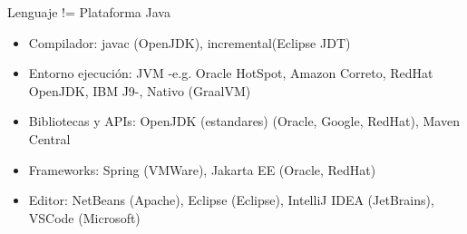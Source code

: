 \documentclass[aspectratio=169]{beamer}
\begin{document}
\begin{frame}{Lenguaje != Plataforma}
    Java
	\begin{itemize}
	\item Compilador: javac (OpenJDK), incremental(Eclipse JDT)
    \item Entorno ejecución: JVM -e.g. Oracle HotSpot, Amazon Correto, RedHat OpenJDK, IBM J9-, Nativo (GraalVM)
    \item Bibliotecas y APIs: OpenJDK (estandares) (Oracle, Google, RedHat), Maven Central
    \item Frameworks: Spring (VMWare), Jakarta EE (Oracle, RedHat)
    \item Editor: NetBeans (Apache), Eclipse (Eclipse), IntelliJ IDEA (JetBrains), VSCode (Microsoft)
	\end{itemize}
\end{frame}
\end{document}
